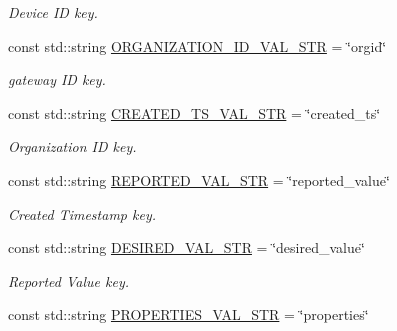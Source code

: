 \begin{DoxyCompactItemize}
\begin{DoxyCompactList}\small\item\em Device ID key. \end{DoxyCompactList}\item 
const std\+::string \hyperlink{namespacevalStrings_a1b7a1ed1b2b1a83e60ea16ec82f18fed}{O\+R\+G\+A\+N\+I\+Z\+A\+T\+I\+O\+N\+\_\+\+I\+D\+\_\+\+V\+A\+L\+\_\+\+S\+TR} = \char`\"{}orgid\char`\"{}\hypertarget{namespacevalStrings_a1b7a1ed1b2b1a83e60ea16ec82f18fed}{}\label{namespacevalStrings_a1b7a1ed1b2b1a83e60ea16ec82f18fed}

\begin{DoxyCompactList}\small\item\em gateway ID key. \end{DoxyCompactList}\item 
const std\+::string \hyperlink{namespacevalStrings_a09911d2de7cbb6c8d3a0e0deec12a9eb}{C\+R\+E\+A\+T\+E\+D\+\_\+\+T\+S\+\_\+\+V\+A\+L\+\_\+\+S\+TR} = \char`\"{}created\+\_\+ts\char`\"{}\hypertarget{namespacevalStrings_a09911d2de7cbb6c8d3a0e0deec12a9eb}{}\label{namespacevalStrings_a09911d2de7cbb6c8d3a0e0deec12a9eb}

\begin{DoxyCompactList}\small\item\em Organization ID key. \end{DoxyCompactList}\item 
const std\+::string \hyperlink{namespacevalStrings_a330f1af19d7f4b0359946dce9493e9da}{R\+E\+P\+O\+R\+T\+E\+D\+\_\+\+V\+A\+L\+\_\+\+S\+TR} = \char`\"{}reported\+\_\+value\char`\"{}\hypertarget{namespacevalStrings_a330f1af19d7f4b0359946dce9493e9da}{}\label{namespacevalStrings_a330f1af19d7f4b0359946dce9493e9da}

\begin{DoxyCompactList}\small\item\em Created Timestamp key. \end{DoxyCompactList}\item 
const std\+::string \hyperlink{namespacevalStrings_af47d3c3580c9f861193b46b67ca204c3}{D\+E\+S\+I\+R\+E\+D\+\_\+\+V\+A\+L\+\_\+\+S\+TR} = \char`\"{}desired\+\_\+value\char`\"{}\hypertarget{namespacevalStrings_af47d3c3580c9f861193b46b67ca204c3}{}\label{namespacevalStrings_af47d3c3580c9f861193b46b67ca204c3}

\begin{DoxyCompactList}\small\item\em Reported Value key. \end{DoxyCompactList}\item 
const std\+::string \hyperlink{namespacevalStrings_a00a4550630e52bd16484e41a4c0a39c2}{P\+R\+O\+P\+E\+R\+T\+I\+E\+S\+\_\+\+V\+A\+L\+\_\+\+S\+TR} = \char`\"{}properties\char`\"{}\hypertarget{namespacevalStrings_a00a4550630e52bd16484e41a4c0a39c2}{}\label{namespacevalStrings_a00a4550630e52bd16484e41a4c0a39c2}


\end{DoxyCompactItemize}
